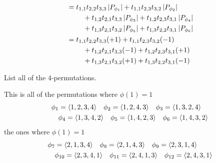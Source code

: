 \begin{exercises}
\begin{answer}
\begin{align*}
             &=\begin{aligned}[t]
                 &t_{1,1}t_{2,2}t_{3,3}\deter{P_{\phi_1}}
                   +t_{1,1}t_{2,3}t_{3,2}\deter{P_{\phi_2}} \\
                 &\hbox{}\quad\hbox{}
                  +t_{1,2}t_{2,1}t_{3,3}\deter{P_{\phi_3}}
                             +t_{1,2}t_{2,3}t_{3,1}\deter{P_{\phi_4}} \\
                 &\hbox{}\quad\hbox{}
                  +t_{1,3}t_{2,1}t_{3,2}\deter{P_{\phi_5}}
                             +t_{1,3}t_{2,2}t_{3,1}\deter{P_{\phi_6}}
               \end{aligned}                                               \\
             &=\begin{aligned}[t]
                 & t_{1,1}t_{2,2}t_{3,3}(+1)
                   +t_{1,1}t_{2,3}t_{3,2}(-1)  \\
                 &\hbox{}\quad\hbox{}
                   +t_{1,2}t_{2,1}t_{3,3}(-1)
                    +t_{1,2}t_{2,3}t_{3,1}(+1) \\
                 &\hbox{}\quad\hbox{}
                   +t_{1,3}t_{2,1}t_{3,2}(+1)
                         +t_{1,3}t_{2,2}t_{3,1}(-1)
               \end{aligned}                                               
          \end{align*}  
     \end{answer}
  \item 
    List all of the $4$-permutations.
    \begin{answer}
      This is all of the permutations where $\phi(1)=1$
      \begin{align*}
        &\phi_1=\langle1,2,3,4\rangle
        \quad
        \phi_2=\langle1,2,4,3\rangle
        \quad
        \phi_3=\langle1,3,2,4\rangle  \\
        &\quad
        \phi_4=\langle1,3,4,2\rangle
        \quad
        \phi_5=\langle1,4,2,3\rangle
        \quad
        \phi_6=\langle1,4,3,2\rangle
      \end{align*}
      the ones where $\phi(1)=1$
      \begin{align*}
        &\phi_7=\langle2,1,3,4\rangle
        \quad
        \phi_8=\langle2,1,4,3\rangle
        \quad
        \phi_9=\langle2,3,1,4\rangle    \\
        &\quad
        \phi_{10}=\langle2,3,4,1\rangle
        \quad
        \phi_{11}=\langle2,4,1,3\rangle
        \quad
        \phi_{12}=\langle2,4,3,1\rangle
      \end{align*}

\end{answer}
\end{exercises}
